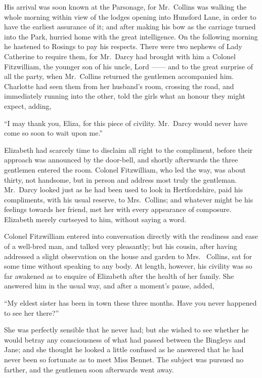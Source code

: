 His arrival was soon known at the Parsonage, for
Mr.\ Collins was walking the whole morning within view
of the lodges opening into Hunsford Lane, in order to
have the earliest assurance of it; and after making his
bow as the carriage turned into the Park, hurried home
with the great intelligence. On the following morning
he hastened to Rosings to pay his respects. There were
two nephews of Lady Catherine to require them, for
Mr.\ Darcy had brought with him a Colonel Fitzwilliam,
the younger son of his uncle, Lord ------ and to the great
surprise of all the party, when Mr.\ Collins returned the
gentlemen accompanied him. Charlotte had seen them
from her husband’s room, crossing the road, and immediately
running into the other, told the girls what an
honour they might expect, adding,

“I may thank you, Eliza, for this piece of civility.
Mr.\ Darcy would never have come so soon to wait upon
me.”

Elizabeth had scarcely time to disclaim all right to
the compliment, before their approach was announced by
the door-bell, and shortly afterwards the three gentlemen
entered the room. Colonel Fitzwilliam, who led the way,
was about thirty, not handsome, but in person and address
most truly the gentleman. Mr.\ Darcy looked just as he
had been used to look in Hertfordshire, paid his compliments,
with his usual reserve, to Mrs.\ Collins; and
whatever might be his feelings towards her friend, met
her with every appearance of composure. Elizabeth
merely curtseyed to him, without saying a word.

Colonel Fitzwilliam entered into conversation directly
with the readiness and ease of a well-bred man, and talked
very pleasantly; but his cousin, after having addressed
a slight observation on the house and garden to Mrs.\ %
Collins, sat for some time without speaking to any body.
At length, however, his civility was so far awakened as
to enquire of Elizabeth after the health of her family.
She answered him in the usual way, and after a moment’s
pause, added,

“My eldest sister has been in town these three months.
Have you never happened to see her there?”

She was perfectly sensible that he never had; but she
wished to see whether he would betray any consciousness
of what had passed between the Bingleys and Jane; and
she thought he looked a little confused as he answered
that he had never been so fortunate as to meet Miss
Bennet. The subject was pursued no farther, and the
gentlemen soon afterwards went away.

